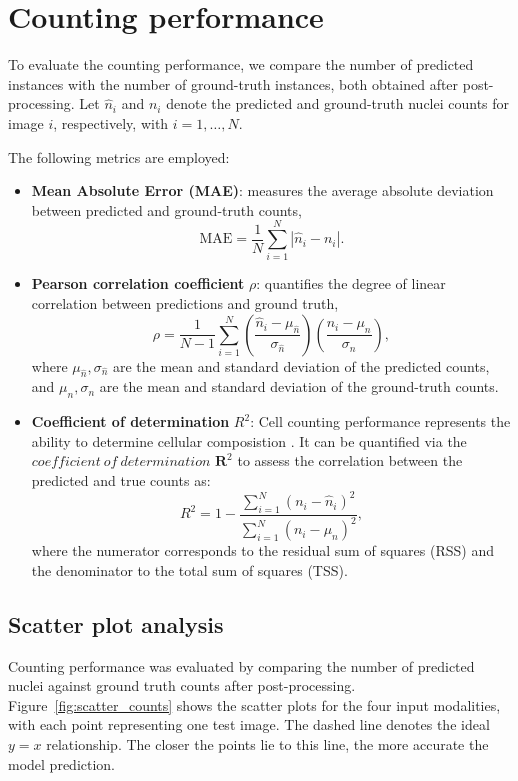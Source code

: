 \documentclass[target=bach,aauheader=,style=]{thud}
\begin{document}
\section{Counting performance}
To evaluate the counting performance, we compare the number of predicted instances with the number of ground-truth instances, both obtained after post-processing. 
Let $\hat{n}_i$ and $n_i$ denote the predicted and ground-truth nuclei counts for image $i$, respectively, with $i=1,\dots,N$.

The following metrics are employed:

\begin{itemize}
    \item \textbf{Mean Absolute Error (MAE)}: measures the average absolute deviation between predicted and ground-truth counts,
    \begin{equation}
        \mathrm{MAE} = \frac{1}{N}\sum_{i=1}^{N} \left| \hat{n}_i - n_i \right|.
    \end{equation}

    \item \textbf{Pearson correlation coefficient} $\rho$: quantifies the degree of linear correlation between predictions and ground truth,
    \begin{equation}
        \rho = \frac{1}{N-1}\sum_{i=1}^N 
        \left(\frac{\hat{n}_i - \mu_{\hat{n}}}{\sigma_{\hat{n}}}\right)
        \left(\frac{n_i - \mu_{n}}{\sigma_{n}}\right),
    \end{equation}
    where $\mu_{\hat{n}}, \sigma_{\hat{n}}$ are the mean and standard deviation of the predicted counts, and $\mu_{n}, \sigma_{n}$ are the mean and standard deviation of the ground-truth counts.

    \item \textbf{Coefficient of determination} $R^2$: Cell counting performance represents the ability to determine cellular composistion \cite{kirillov2019panoptic}. It can be quantified via the $coefficient\ of\ determination$ $\textbf{R}^2$ to assess the correlation between the predicted and true counts as:
    \begin{equation}
        R^2 = 1 - \frac{\sum_{i=1}^N (n_i - \hat{n}_i)^2}{\sum_{i=1}^N (n_i - \mu_{n})^2},
    \end{equation}
    where the numerator corresponds to the residual sum of squares (RSS) and the denominator to the total sum of squares (TSS).
\end{itemize}

\subsection{Scatter plot analysis}
Counting performance was evaluated by comparing the number of predicted nuclei against ground truth counts after post-processing. 
Figure~\ref{fig:scatter_counts} shows the scatter plots for the four input modalities, with each point representing one test image. 
The dashed line denotes the ideal $y=x$ relationship. 
The closer the points lie to this line, the more accurate the model prediction.
\end{document}
